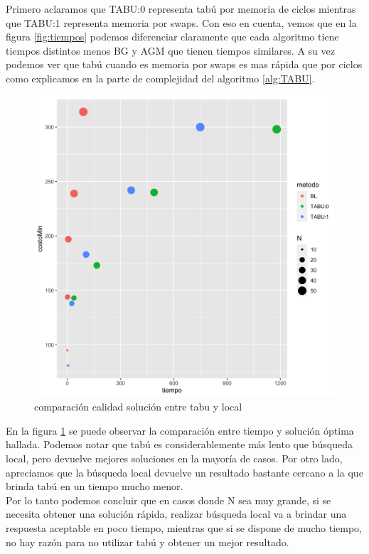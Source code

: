 \documentclass[10pt,a4paper]{article}
\begin{document}
Primero aclaramos que TABU:0 representa tabú por memoria de ciclos mientras que TABU:1 representa memoria por swaps.
Con eso en cuenta, vemos que en la figura \ref{fig:tiempos} podemos diferenciar claramente que cada algoritmo tiene tiempos distintos menos BG y AGM que tienen tiempos similares.
A su vez podemos ver que tabú cuando es memoria por swaps es mas rápida que por ciclos como explicamos en la parte de complejidad del algoritmo \ref{alg:TABU}.
\\
\begin{figure} [H]
    \centering
    \includegraphics[scale=0.15]{img/CalidadvsTiempo.png}
    \caption{comparación calidad solución entre tabu y local}
    \label{fig:calidad}
\end{figure}

En la figura \ref{fig:calidad} se puede observar la comparación entre tiempo y solución óptima hallada. Podemos notar que tabú es considerablemente más lento que búsqueda local, pero devuelve mejores soluciones en la mayoría de casos. Por otro lado, apreciamos que la búsqueda local devuelve un resultado bastante cercano a la que brinda tabú en un tiempo mucho menor.\\
Por lo tanto podemos concluir que en casos donde N sea muy grande, si se necesita obtener una solución rápida, realizar búsqueda local va a brindar una respuesta aceptable en poco tiempo, mientras que si se dispone de mucho tiempo, no hay razón para no utilizar tabú y obtener un mejor resultado.
\end{document}
